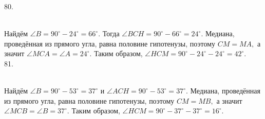 \documentclass[12pt]{article}
\begin{document}
80. \begin{figure}[ht!]
\end{figure}\\
Найдём $\angle B=90^\circ-24^\circ=66^\circ.$ Тогда $\angle BCH=90^\circ-66^\circ=24^\circ.$ Медиана, проведённая из прямого угла, равна половине гипотенузы, поэтому $CM=MA,$ а значит $\angle MCA=\angle A=24^\circ.$ Таким образом, $\angle HCM=90^\circ-24^\circ-24^\circ=42^\circ.$\\
81. \begin{figure}[ht!]
\end{figure}\\
Найдём $\angle B=90^\circ-53^\circ=37^\circ$ и $\angle ACH=90^\circ-53^\circ=37^\circ.$ Медиана, проведённая из прямого угла, равна половине гипотенузы, поэтому $CM=MB,$ а значит $\angle MCB=\angle B=37^\circ.$ Таким образом, $\angle HCM=90^\circ-37^\circ-37^\circ=16^\circ.$\\
\end{document}
